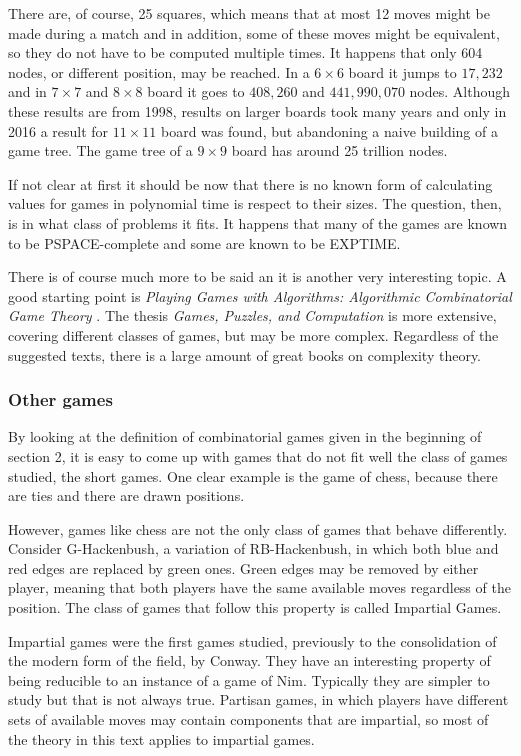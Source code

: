 There are, of course, 25 squares, which means that at most 12 moves might be made during a match and in addition, some of these moves might be equivalent, so they do not have to be computed multiple times. It happens that only 604 nodes, or different position, may be reached\cite{1}. In a $6\times 6$ board it jumps to $17,232$ and in $7\times 7$ and $8\times 8$ board it goes to $408,260$ and $441,990,070$ nodes. Although these results are from 1998, results on larger boards took many years and only in 2016 a result for $11 \times 11$\cite{2} board was found, but abandoning a naive building of a game tree. The game tree of a $9\times 9$ board has around 25 trillion nodes.

If not clear at first it should be now that there is no known form of calculating values for games in polynomial time is respect to their sizes. The question, then, is in what class of problems it fits. It happens that many of the games are known to be PSPACE-complete and some are known to be EXPTIME.

There is of course much more to be said an it is another very interesting topic. A good starting point is \textit{Playing Games with Algorithms: Algorithmic Combinatorial Game Theory} \cite{3}. The thesis \textit{Games, Puzzles, and Computation} \cite{4} is more extensive, covering different classes of games, but may be more complex. Regardless of the suggested texts, there is a large amount of great books on complexity theory.

\subsubsection*{Other games}

By looking at the definition of combinatorial games given in the beginning of section 2, it is easy to come up with games that do not fit well the class of games studied, the short games. One clear example is the game of chess, because there are ties and there are drawn positions.

However, games like chess are not the only class of games that behave differently. Consider G-Hackenbush, a variation of RB-Hackenbush, in which both blue and red edges are replaced by green ones. Green edges may be removed by either player, meaning that both players have the same available moves regardless of the position. The class of games that follow this property is called Impartial Games.

Impartial games were the first games studied, previously to the consolidation of the modern form of the field, by Conway. They have an interesting property of being reducible to an instance of a game of Nim. Typically they are simpler to study but that is not always true. Partisan games, in which players have different sets of available moves may contain components that are impartial, so most of the theory in this text applies to impartial games.

